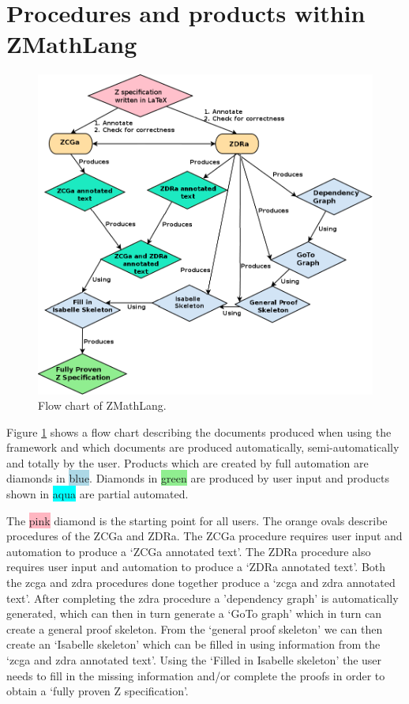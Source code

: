 \section{Procedures and products within ZMathLang}

\begin{figure}[H]
 \begin{center}
 \includegraphics [scale=0.4]{Figures/Design/ZMathLangFlow.png}
 \caption{Flow chart of ZMathLang.}
 \label{fig:zmathflow}
\end{center}
\end{figure} 

Figure \ref{fig:zmathflow} shows a flow chart describing the documents produced
when using the framework and which documents are produced automatically,
semi-automatically and totally by the user. Products which are created by full
automation are diamonds in \colorbox{lightblue}{blue}. Diamonds in
\colorbox{lightgreen}{green} are produced by user input and products shown in
\colorbox{aqua}{aqua} are partial automated.

The \colorbox{lightpink}{pink} diamond is the starting point for all users. The
\colorbox{lightorange}{orange} ovals describe procedures of the ZCGa and ZDRa.
The ZCGa procedure requires user input and automation to produce a `ZCGa
annotated text'. The ZDRa procedure also requires user input and automation to
produce a `ZDRa annotated text'. Both the \gls{zcga} and \gls{zdra} procedures
done together produce a `\gls{zcga} and \gls{zdra} annotated text'. After
completing the \gls{zdra} procedure a 'dependency graph' is automatically
generated, which can then in turn generate a `GoTo graph' which in turn can
create a general proof skeleton. From the `general proof skeleton' we can then
create an `Isabelle skeleton'  which can be filled in using information from the
`\gls{zcga} and \gls{zdra} annotated text'. Using the `Filled in Isabelle
skeleton' the user needs to fill in the missing information and/or complete the
proofs in order to obtain a `fully proven Z specification'.

